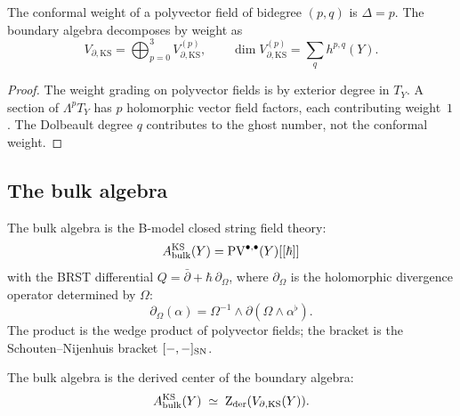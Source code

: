 \begin{proposition}
The conformal weight of a polyvector field of bidegree $(p,q)$ is
$\Delta = p$. The boundary algebra decomposes by weight as
\begin{equation}%
V_{\partial,\mathrm{KS}}
= \bigoplus_{p=0}^{3} V_{\partial,\mathrm{KS}}^{(p)},
\qquad
\dim V_{\partial,\mathrm{KS}}^{(p)} = \sum_q h^{p,q}(Y).
\end{equation}
\end{proposition}

\begin{proof}
The weight grading on polyvector fields is by exterior degree in $T_Y$.
A section of $\Lambda^p T_Y$ has $p$ holomorphic vector field factors,
each contributing weight~$1$. The Dolbeault degree $q$ contributes
to the ghost number, not the conformal weight.
\end{proof}


\subsection{The bulk algebra}

\begin{definition}
The bulk algebra is the B-model closed string field theory:
\begin{equation}%
A_{\mathrm{bulk}}^{\mathrm{KS}}(Y)
= \PV^{\bullet,\bullet}(Y)[[\hbar]]
\end{equation}
with the BRST differential $Q = \bar\partial + \hbar\,\partial_\Omega$,
where $\partial_\Omega$ is the holomorphic divergence operator
determined by $\Omega$:
\begin{equation}%
\partial_\Omega(\alpha) = \Omega^{-1} \wedge \partial(\Omega \wedge
\alpha^\flat).
\end{equation}
The product is the wedge product of polyvector fields; the bracket is
the Schouten--Nijenhuis bracket $[-,-]_{\mathrm{SN}}$.
\end{definition}

\begin{theorem}
The bulk algebra is the derived center of the boundary algebra:
\begin{equation}%
A_{\mathrm{bulk}}^{\mathrm{KS}}(Y)
\;\simeq\;
\Zder(V_{\partial,\mathrm{KS}}(Y)).
\end{equation}
\end{theorem}

